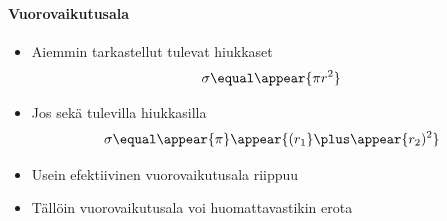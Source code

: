\begin{frame}
\frametitle{\texorpdfstring{\culine[\sectiontitleulinecolor]{\sectiontitle}}{\sectiontitle} }
\framesubtitle{Vuorovaikutusala}%
\appear{}

\begin{itemize}
	\item Aiemmin tarkastellut tulevat hiukkaset   
\[
\sigma  \equal \appear{\pi r^{2}}
\]

\item Jos sekä tulevilla hiukkasilla  
\[
\sigma  \equal \appear{\pi} \appear{( r_{1}}  \plus \appear{r_{2} )^{2}}
\]

\item Usein efektiivinen vuorovaikutusala riippuu 

\item Tällöin vuorovaikutusala voi huomattavastikin erota   %
\end{itemize}


\endofslide 
\end{frame}

